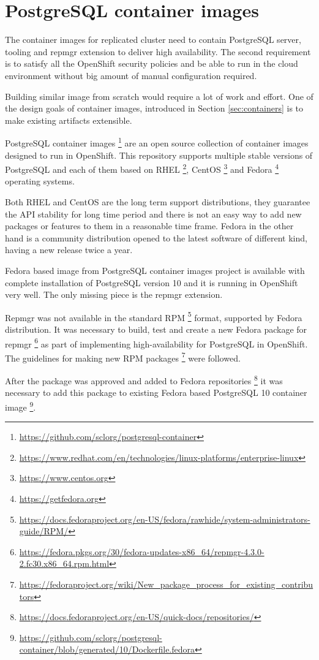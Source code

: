 \documentclass[
  digital, %
  twoside, %
  table,   %
  lof,     %
  lot,     %
]{fithesis3}
\begin{document}
\section{PostgreSQL container images}
The container images for replicated cluster need to contain PostgreSQL server, tooling and repmgr extension to deliver high availability. The second requirement is to satisfy all the OpenShift security policies and be able to run in the cloud environment without big amount of manual configuration required.

Building similar image from scratch would require a lot of work and effort. One of the design goals of container images, introduced in Section \ref{sec:containers} is to make existing artifacts extensible.

PostgreSQL container images \footnote{\url{https://github.com/sclorg/postgresql-container}} are an open source collection of container images designed to run in OpenShift. This repository supports multiple stable versions of PostgreSQL and each of them based on RHEL \footnote{\url{https://www.redhat.com/en/technologies/linux-platforms/enterprise-linux}}, CentOS \footnote{\url{https://www.centos.org}} and Fedora \footnote{\url{https://getfedora.org}} operating systems.

Both RHEL and CentOS are the long term support distributions, they guarantee the API stability for long time period and there is not an easy way to add new packages or features to them in a reasonable time frame. Fedora in the other hand is a community distribution opened to the latest software of different kind, having a new release twice a year.

Fedora based image from PostgreSQL container images project is available with complete installation of PostgreSQL version 10 and it is running in OpenShift very well. The only missing piece is the repmgr extension.

Repmgr was not available in the standard RPM \footnote{\url{https://docs.fedoraproject.org/en-US/fedora/rawhide/system-administrators-guide/RPM/}} format, supported by Fedora distribution. It was necessary to build, test and create a new Fedora package for repmgr \footnote{\url{https://fedora.pkgs.org/30/fedora-updates-x86_64/repmgr-4.3.0-2.fc30.x86_64.rpm.html}} as part of implementing high-availability for PostgreSQL in OpenShift. The guidelines for making new RPM packages \footnote{\url{https://fedoraproject.org/wiki/New_package_process_for_existing_contributors}} were followed.

After the package was approved and added to Fedora repositories \footnote{\url{https://docs.fedoraproject.org/en-US/quick-docs/repositories/}} it was necessary to add this package to existing Fedora based PostgreSQL 10 container image \footnote{\url{https://github.com/sclorg/postgresql-container/blob/generated/10/Dockerfile.fedora}}.
\end{document}
